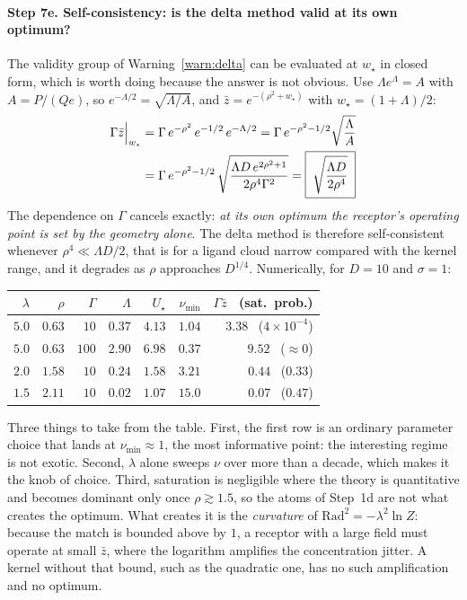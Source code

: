 \documentclass[11pt,a4paper]{article}
\begin{document}
\paragraph{Step 7e. Self-consistency: is the delta method valid at its own optimum?}
The validity group of Warning~\ref{warn:delta} can be evaluated at $w_\star$ in closed
form, which is worth doing because the answer is not obvious. Use
$\Lambda e^{\Lambda}=A$ with $A=P/(Qe)$, so $e^{-\Lambda/2}=\sqrt{\Lambda/A}$, and
$\bar z = e^{-(\rho^2+w_\star)}$ with $w_\star=(1+\Lambda)/2$:
\begin{align}
  \Gamma\bar z\Big|_{w_\star}
   &= \Gamma\,e^{-\rho^2}\,e^{-1/2}\,e^{-\Lambda/2}
    = \Gamma\,e^{-\rho^2-1/2}\sqrt{\frac{\Lambda}{A}} \notag\\
   &= \Gamma\,e^{-\rho^2-1/2}\,
      \sqrt{\frac{\Lambda D\,e^{2\rho^2+1}}{2\rho^4\Gamma^2}}
    = \boxed{\;\sqrt{\frac{\Lambda D}{2\rho^4}}\;}
  \label{eq:selfcons}
\end{align}
The dependence on $\Gamma$ cancels exactly: \emph{at its own optimum the receptor's
operating point is set by the geometry alone}. The delta method is therefore
self-consistent whenever $\rho^4 \ll \Lambda D/2$, that is for a ligand cloud narrow
compared with the kernel range, and it degrades as $\rho$ approaches $D^{1/4}$.
Numerically, for $D=10$ and $\sigma=1$:

\begin{center}
\begin{tabular}{rrrrrrr}
\toprule
$\lambda$ & $\rho$ & $\Gamma$ & $\Lambda$ & $U_\star$ & $\nu_{\min}$ & $\Gamma\bar z$ \ (sat.\ prob.) \\
\midrule
$5.0$ & $0.63$ & $10$  & $0.37$ & $4.13$ & $1.04$ & $3.38$ \ ($4\times10^{-4}$) \\
$5.0$ & $0.63$ & $100$ & $2.90$ & $6.98$ & $0.37$ & $9.52$ \ ($\approx 0$) \\
$2.0$ & $1.58$ & $10$  & $0.24$ & $1.58$ & $3.21$ & $0.44$ \ ($0.33$) \\
$1.5$ & $2.11$ & $10$  & $0.02$ & $1.07$ & $15.0$ & $0.07$ \ ($0.47$) \\
\bottomrule
\end{tabular}
\end{center}

Three things to take from the table. First, the first row is an ordinary parameter
choice that lands at $\nu_{\min}\approx1$, the most informative point: the interesting
regime is not exotic. Second, $\lambda$ alone sweeps $\nu$ over more than a decade,
which makes it the knob of choice. Third, saturation is negligible where the theory is
quantitative and becomes dominant only once $\rho\gtrsim1.5$, so the atoms of Step~1d
are not what creates the optimum. What creates it is the \emph{curvature} of
$\mathrm{Rad}^2=-\lambda^2\ln Z$: because the match is bounded above by $1$, a receptor
with a large field must operate at small $\bar z$, where the logarithm amplifies the
concentration jitter. A kernel without that bound, such as the quadratic one, has no
such amplification and no optimum.
\end{document}
